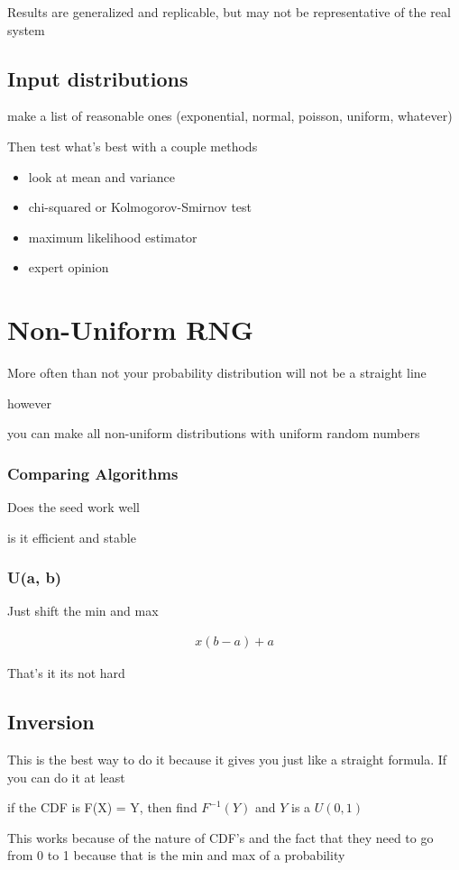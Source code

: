 \documentclass[fleqn]{report}
\newcommand{\equations} [1] {
\begin{gather*}
#1
\end{gather*}
}
\begin{document}
Results are generalized and replicable, but may not be representative 
of the real system 

\section{Input distributions}
make a list of reasonable ones (exponential, normal, poisson, uniform, whatever)

Then test what's best with a couple methods 

\begin{itemize}
    \item 
    look at mean and variance 
    \item 
    chi-squared or Kolmogorov-Smirnov test 
    \item 
    maximum likelihood estimator 
    \item 
    expert opinion
\end{itemize}

\chapter{Non-Uniform RNG}
More often than not your probability distribution will not be a straight line 

however 

you can make all non-uniform distributions with uniform random numbers 

\subsection{Comparing Algorithms}
Does the seed work well 

is it efficient and stable 

\subsection{U(a, b)}
Just shift the min and max 
\equations{
    x(b - a) + a
}

That's it its not hard 

\section{Inversion}
This is the best way to do it because it gives you just like a straight 
formula. If you can do it at least 

if the CDF is F(X) = Y, then find $F^{-1}(Y)$ and $Y$ is a $U(0, 1)$ 

This works because of the nature of CDF's and the fact that they need to go 
from 0 to 1 because that is the min and max of a probability 
\end{document}
